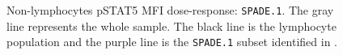 \begin{figure}
\begin{minipage}{.5\textwidth}
\end{minipage}
\begin{minipage}{.3\textwidth}
{ Non-lymphocytes pSTAT5 MFI dose-response: \texttt{SPADE.1}. }
{
    The gray line represents the whole sample.
The black line is the lymphocyte population and the purple line is the \texttt{SPADE.1} subset identified in .
}
\end{minipage}
\end{figure}


\clearpage



%
%
%
%
%
%
